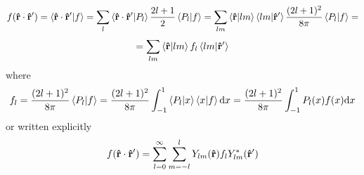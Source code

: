 \begin{equation*}
  f({\bf\hat r}\cdot{\bf\hat r'})=\mathinner{\langle{{\bf\hat r}\cdot{\bf\hat r'}|f}\rangle}= \sum_l \mathinner{\langle{{\bf\hat r}\cdot{\bf\hat r'}|P_l}\rangle}{2l+1\over2}\mathinner{\langle{P_l|f}\rangle}= \sum_{lm}\mathinner{\langle{{\bf\hat r}|lm}\rangle}\mathinner{\langle{lm|{\bf\hat r'}}\rangle}{(2l+1)^2\over8\pi} \mathinner{\langle{P_l|f}\rangle}=
\end{equation*}
\begin{equation*}
  =\sum_{lm}\mathinner{\langle{{\bf\hat r}|lm}\rangle}f_l \mathinner{\langle{lm|{\bf\hat r'}}\rangle}
\end{equation*}
where 
\begin{equation*}
  f_l={(2l+1)^2\over8\pi}\mathinner{\langle{P_l|f}\rangle} ={(2l+1)^2\over8\pi}\int_{-1}^1 \mathinner{\langle{P_l|x}\rangle}\mathinner{\langle{x|f}\rangle}{\rm d} x ={(2l+1)^2\over8\pi}\int_{-1}^1 P_l(x)f(x){\rm d} x
\end{equation*}
or written explicitly 
\begin{equation}
  f({\bf\hat r}\cdot{\bf\hat r'})= \sum_{l=0}^\infty\sum_{m=-l}^l Y_{lm}({\bf\hat r}) f_l Y_{lm}^*({\bf\hat r'})  \label{fylm}
\end{equation}
